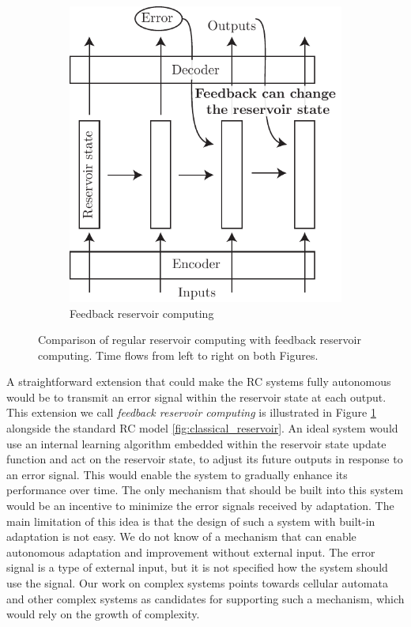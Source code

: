 \begin{figure}[htbp]
\begin{subfigure}[t]{.45\linewidth}
    \includegraphics[width=\linewidth]{figures/feedback_reservoir.pdf}
    \caption{Feedback reservoir computing}
    \label{fig:feedback_reservoir}
  \end{subfigure}
  \caption{Comparison of regular reservoir computing with feedback reservoir
    computing. Time flows from left to right on both Figures.}
  \label{fig:reservoir_comp}
\end{figure}

A straightforward extension that could make the \ac{RC} systems fully autonomous
would be to transmit an error signal within the reservoir state at each
output. This extension we call \emph{feedback reservoir computing} is
illustrated in Figure \ref{fig:feedback_reservoir} alongside the standard
\ac{RC} model \ref{fig:classical_reservoir}. 
An ideal system would use an internal learning algorithm embedded within 
the reservoir state update function and act on the reservoir state, to 
adjust its future outputs in response to an error signal. This would enable 
the system to gradually enhance its performance over time.
The only mechanism that should be built into
this system would be an incentive to minimize the error signals received by
adaptation. The main limitation of this idea is that the design of such a system with
built-in adaptation is not easy. We do not know of a mechanism that can enable
autonomous adaptation and improvement without external input. The error signal is a 
type of external input, but it is not specified how the system should use the 
signal. Our work on
complex systems points towards cellular automata and other complex systems as
candidates for supporting such a mechanism, which would rely on the growth of
complexity.

